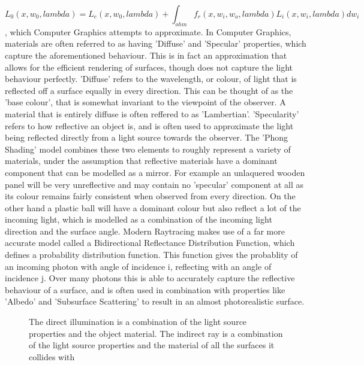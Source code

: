 \documentclass[ %
                    author={Gavin Parker},
                supervisor={Dr. Neill Campbell},
                    degree={MEng},
                     title={Deep Siamese Networks for Illumination Estimation from Stereo Images},
                  subtitle={},
                      type={research},
                      year={2018} ]{dissertation}
\begin{document}
\[L_0(x, w_0, lambda) = L_e(x, w_0, lambda) + \int_{ohm}{f_r(x, w_i, w_o,lambda)L_i(x, w_i, lambda)dw_i}\],
which Computer Graphics attempts to approximate.
\newline
In Computer Graphics, materials are often referred to as having 'Diffuse' and 'Specular' properties, which capture the aforementioned behaviour. This is in fact an approximation that allows for the efficient rendering of surfaces, though does not capture the light behaviour perfectly. 'Diffuse' refers to the wavelength, or colour, of light that is reflected off a surface equally in every direction. This can be thought of as the 'base colour', that is somewhat invariant to the viewpoint of the observer. A material that is entirely diffuse is often reffered to as 'Lambertian'. 'Specularity' refers to how reflective an object is, and is often used to approximate the light being reflected directly from a light source towards the observer. The 'Phong Shading' model combines these two elements to roughly represent a variety of materials, under the assumption that reflective materials have a dominant component that can be modelled as a mirror. For example an unlaquered wooden panel will be very unreflective and may contain no 'specular' component at all as its colour remains fairly consistent when observed from every direction. On the other hand a plastic ball will have a dominant colour but also reflect a lot of the incoming light, which is modelled as a combination of the incoming light direction and the surface angle. Modern Raytracing makes use of a far more accurate model called a Bidirectional Reflectance Distribution Function, which defines a probability distribution function. This function gives the probablity of an incoming photon with angle of incidence i, reflecting with an angle of incidence j. Over many photons this is able to accurately capture the reflective behaviour of a surface, and is often used in combination with properties like 'Albedo' and 'Subsurface Scattering' to result in an almost photorealistic surface.
\begin{center}
\begin{figure}
\centering
{}
\label{raytracing}
\caption{The direct illumination is a combination of the light source properties and the object material. The indirect ray is a combination of the light source properties and the material of all the surfaces it collides with}
\end{figure}
\end{center}
\end{document}
